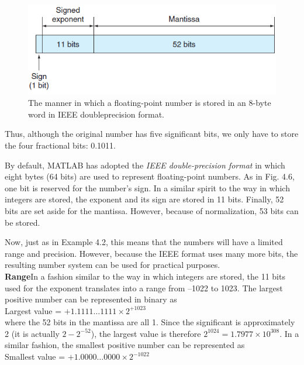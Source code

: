\documentclass[../main.tex]{subfiles}
\begin{document}
\begin{figure}[h]
    \includegraphics{./images/fig_4_6}
    \caption{The manner in which a floating-point number is stored in an 8-byte word in IEEE doubleprecision
    format.}
\end{figure}

\noindent
Thus, although the original number has five significant bits, we only have to store the four
fractional bits: 0.1011.

By default, MATLAB has adopted the \emph{IEEE double-precision format} in which eight
bytes (64 bits) are used to represent floating-point numbers. As in Fig. 4.6, one bit is reserved
for the number's sign. In a similar spirit to the way in which integers are stored, the
exponent and its sign are stored in 11 bits. Finally, 52 bits are set aside for the mantissa.
However, because of normalization, 53 bits can be stored.

Now, just as in Example 4.2, this means that the numbers will have a limited range and
precision. However, because the IEEE format uses many more bits, the resulting number
system can be used for practical purposes.\\

\noindent
\textbf{Range}\quad In a fashion similar to the way in which integers are stored, the 11 bits used for
the exponent translates into a range from --1022 to 1023. The largest positive number can
be represented in binary as\\

Largest value = $+1.1111\hdots1111\times 2^{+1023}$\\

\noindent
where the 52 bits in the mantissa are all 1. Since the significant is approximately 2 (it is
actually $2-2^{-52}$), the largest value is therefore $2^{1024}=1.7977\times 10^{308}$. In a similar
fashion, the smallest positive number can be represented as\\

Smallest value = $+1.0000\hdots 0000\times 2^{-1022}$\\
\end{document}
